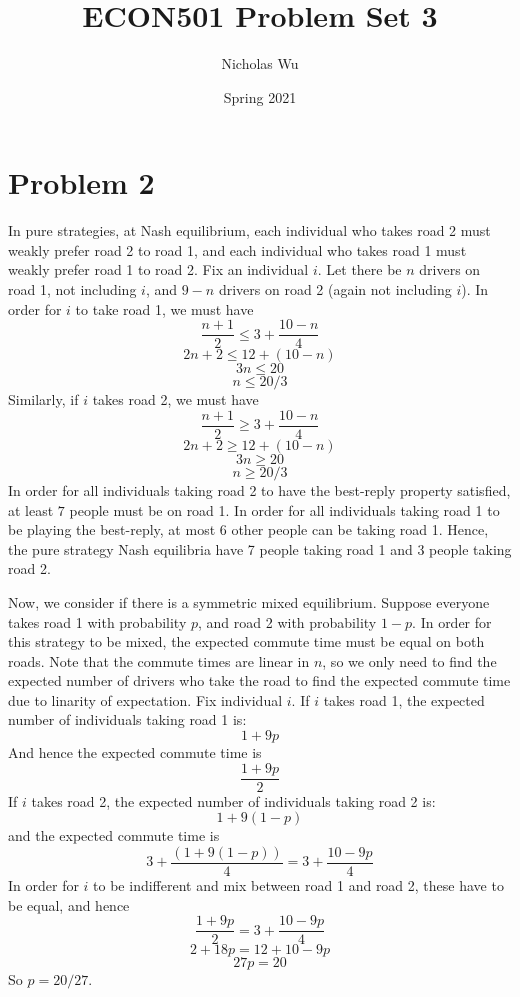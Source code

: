 \documentclass[10pt,letter]{article}
\begin{document}


\title{ECON501 Problem Set 3}

\author{Nicholas Wu}

\date{Spring 2021}

\maketitle

\section*{Problem 2}
In pure strategies, at Nash equilibrium, each individual who takes road 2 must weakly prefer road 2 to road 1, and each individual who takes road 1 must weakly prefer road 1 to road 2. Fix an individual $i$. Let there be $n$ drivers on road 1, not including $i$, and $9 - n$ drivers on road 2 (again not including $i$). In order for $i$ to take road 1, we must have
\[\frac{n+1}{2} \le 3 + \frac{10 - n}{4} \]
\[ 2n + 2 \le 12 + (10 - n) \]
\[ 3n \le 20 \]
\[ n \le 20/3 \]
Similarly, if $i$ takes road 2, we must have
\[\frac{n+1}{2} \ge 3 + \frac{10 - n}{4} \]
\[ 2n + 2 \ge 12 + (10 - n) \]
\[ 3n \ge 20 \]
\[ n \ge 20/3 \]
In order for all individuals taking road 2 to have the best-reply property satisfied, at least $7$ people must be on road 1. In order for all individuals taking road 1 to be playing the best-reply, at most $6$ other people can be taking road 1. Hence, the pure strategy Nash equilibria have 7 people taking road 1 and 3 people taking road 2.

Now, we consider if there is a symmetric mixed equilibrium. Suppose everyone takes road 1 with probability $p$, and road 2 with probability $1-p$. In order for this strategy to be mixed, the expected commute time must be equal on both roads. Note that the commute times are linear in $n$, so we only need to find the expected number of drivers who take the road to find the expected commute time due to linarity of expectation. Fix individual $i$. If $i$ takes road 1, the expected number of individuals taking road 1 is:
\[ 1 + 9p \]
And hence the expected commute time is
\[ \frac{1+9p}{2} \]
If $i$ takes road 2, the expected number of individuals taking road 2 is:
\[ 1 + 9(1-p) \]
and the expected commute time is
\[ 3 + \frac{(1 + 9(1-p))}{4} = 3 + \frac{10 - 9p}{4}\]
In order for $i$ to be indifferent and mix between road 1 and road 2, these have to be equal, and hence
\[\frac{1+9p}{2} =  3 + \frac{10 -9p}{4} \]
\[2 + 18p =  12 + 10 - 9p \]
\[ 27p = 20 \]
So $p = 20/27$.
\end{document}
